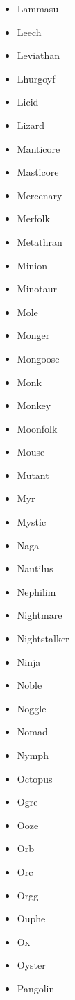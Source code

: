 \documentclass{article}
\begin{document}
\begin{multicols}{3}
\begin{itemize}
        \item Lammasu
        \item Leech
        \item Leviathan
        \item Lhurgoyf
        \item Licid
        \item Lizard
        \item Manticore
        \item Masticore
        \item Mercenary
        \item Merfolk
        \item Metathran
        \item Minion
        \item Minotaur
        \item Mole
        \item Monger
        \item Mongoose
        \item Monk
        \item Monkey
        \item Moonfolk
        \item Mouse
        \item Mutant
        \item Myr
        \item Mystic
        \item Naga
        \item Nautilus
        \item Nephilim
        \item Nightmare
        \item Nightstalker
        \item Ninja
        \item Noble
        \item Noggle
        \item Nomad
        \item Nymph
        \item Octopus
        \item Ogre
        \item Ooze
        \item Orb
        \item Orc
        \item Orgg
        \item Ouphe
        \item Ox
        \item Oyster
        \item Pangolin

\end{itemize}
\end{multicols}
\end{document}

